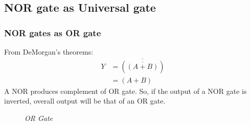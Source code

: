 	\subsection{NOR gate as Universal gate}
		\subsubsection{NOR gates as OR gate}			
		From DeMorgan’s theorems:
		\begin{align*}
			Y &= \overline{(\overline{(A+B)})} \\
			  &= (A + B)
		\end{align*}
		A NOR produces complement of OR gate. So, if the output of a NOR gate is inverted, overall output will be that of an OR gate.
		\begin{figure}[ht]
			\centering
			\hfill
			\caption{\textit{OR Gate}}
		\end{figure}			
		
